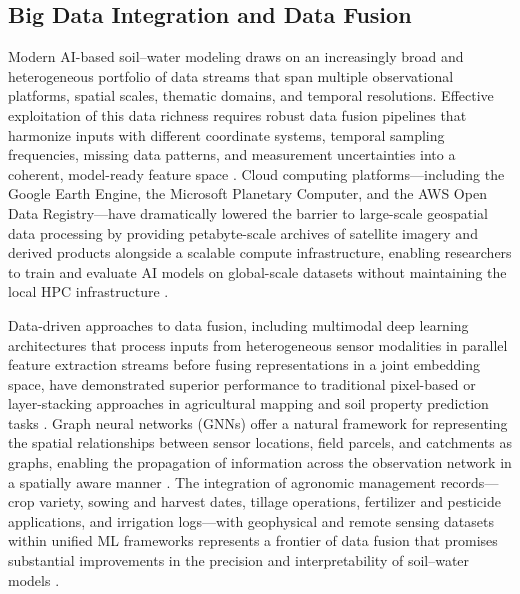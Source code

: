 \documentclass[land,review,accept,pdftex,oneauthor]{Definitions/mdpi}
\begin{document}
\subsection{Big Data Integration and Data Fusion}

Modern AI-based soil--water modeling draws on an increasingly broad and heterogeneous portfolio of data streams that span multiple observational platforms, spatial scales, thematic domains, and temporal resolutions. Effective exploitation of this data richness requires robust data fusion pipelines that harmonize inputs with different coordinate systems, temporal sampling frequencies, missing data patterns, and measurement uncertainties into a coherent, model-ready feature space \citep{Reichstein2019,Bergen2019}. Cloud computing platforms---including the Google Earth Engine, the Microsoft Planetary Computer, and the AWS Open Data Registry---have dramatically lowered the barrier to large-scale geospatial data processing by providing petabyte-scale archives of satellite imagery and derived products alongside a scalable compute infrastructure, enabling researchers to train and evaluate AI models on global-scale datasets without maintaining the local HPC infrastructure \citep{gorelick2017google}.

Data-driven approaches to data fusion, including multimodal deep learning architectures that process inputs from heterogeneous sensor modalities in parallel feature extraction streams before fusing representations in a joint embedding space, have demonstrated superior performance to traditional pixel-based or layer-stacking approaches in agricultural mapping and soil property prediction tasks \citep{hong2021multimodal}. Graph neural networks (GNNs) offer a natural framework for representing the spatial relationships between sensor locations, field parcels, and catchments as graphs, enabling the propagation of information across the observation network in a spatially aware manner \citep{xu2021graph}. The integration of agronomic management records---crop variety, sowing and harvest dates, tillage operations, fertilizer and pesticide applications, and irrigation logs---with geophysical and remote sensing datasets within unified ML frameworks represents a frontier of data fusion that promises substantial improvements in the precision and interpretability of soil--water models \citep{Liakos2018,Benos2021}.

\end{document}
